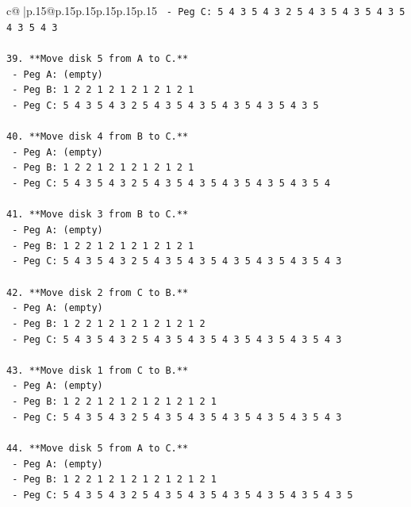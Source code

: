 \documentclass{article}
\begin{document}
{\begin{supertabular}{c@{$\;$}|p{.15\linewidth}@{}p{.15\linewidth}p{.15\linewidth}p{.15\linewidth}p{.15\linewidth}p{.15\linewidth}}
{{{\texttt{    {-} Peg C: 5 4 3 5 4 3 2 5 4 3 5 4 3 5 4 3 5 4 3 5 4 3} \\
\\ 
\texttt{39. **Move disk 5 from A to C.**} \\
\texttt{    {-} Peg A: (empty)} \\
\texttt{    {-} Peg B: 1 2 2 1 2 1 2 1 2 1 2 1} \\
\texttt{    {-} Peg C: 5 4 3 5 4 3 2 5 4 3 5 4 3 5 4 3 5 4 3 5 4 3 5} \\
\\ 
\texttt{40. **Move disk 4 from B to C.**} \\
\texttt{    {-} Peg A: (empty)} \\
\texttt{    {-} Peg B: 1 2 2 1 2 1 2 1 2 1 2 1} \\
\texttt{    {-} Peg C: 5 4 3 5 4 3 2 5 4 3 5 4 3 5 4 3 5 4 3 5 4 3 5 4} \\
\\ 
\texttt{41. **Move disk 3 from B to C.**} \\
\texttt{    {-} Peg A: (empty)} \\
\texttt{    {-} Peg B: 1 2 2 1 2 1 2 1 2 1 2 1} \\
\texttt{    {-} Peg C: 5 4 3 5 4 3 2 5 4 3 5 4 3 5 4 3 5 4 3 5 4 3 5 4 3} \\
\\ 
\texttt{42. **Move disk 2 from C to B.**} \\
\texttt{    {-} Peg A: (empty)} \\
\texttt{    {-} Peg B: 1 2 2 1 2 1 2 1 2 1 2 1 2} \\
\texttt{    {-} Peg C: 5 4 3 5 4 3 2 5 4 3 5 4 3 5 4 3 5 4 3 5 4 3 5 4 3} \\
\\ 
\texttt{43. **Move disk 1 from C to B.**} \\
\texttt{    {-} Peg A: (empty)} \\
\texttt{    {-} Peg B: 1 2 2 1 2 1 2 1 2 1 2 1 2 1} \\
\texttt{    {-} Peg C: 5 4 3 5 4 3 2 5 4 3 5 4 3 5 4 3 5 4 3 5 4 3 5 4 3} \\
\\ 
\texttt{44. **Move disk 5 from A to C.**} \\
\texttt{    {-} Peg A: (empty)} \\
\texttt{    {-} Peg B: 1 2 2 1 2 1 2 1 2 1 2 1 2 1} \\
\texttt{    {-} Peg C: 5 4 3 5 4 3 2 5 4 3 5 4 3 5 4 3 5 4 3 5 4 3 5 4 3 5} \\
\\ 
}}}
\end{supertabular}}
\end{document}
